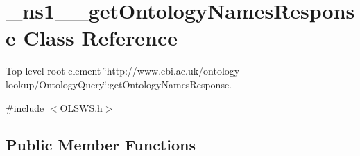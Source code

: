 \hypertarget{class__ns1____getOntologyNamesResponse}{
\section{\_\-ns1\_\-\_\-getOntologyNamesResponse Class Reference}
\label{class__ns1____getOntologyNamesResponse}
}


Top-\/level root element \char`\"{}http://www.ebi.ac.uk/ontology-\/lookup/OntologyQuery\char`\"{}:getOntologyNamesResponse.  




{\ttfamily \#include $<$OLSWS.h$>$}

\subsection*{Public Member Functions}

